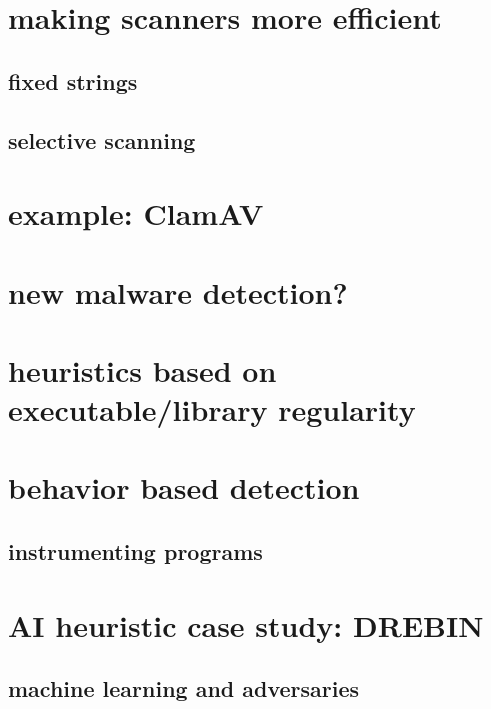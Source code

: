 \section{making scanners more efficient}


\subsection{fixed strings}


\subsection{selective scanning}


\section{example: ClamAV}


\section{new malware detection?}


\section{heuristics based on executable/library regularity}


\section{behavior based detection}


\subsection{instrumenting programs}


\section{AI heuristic case study: DREBIN}


\subsection{machine learning and adversaries}


